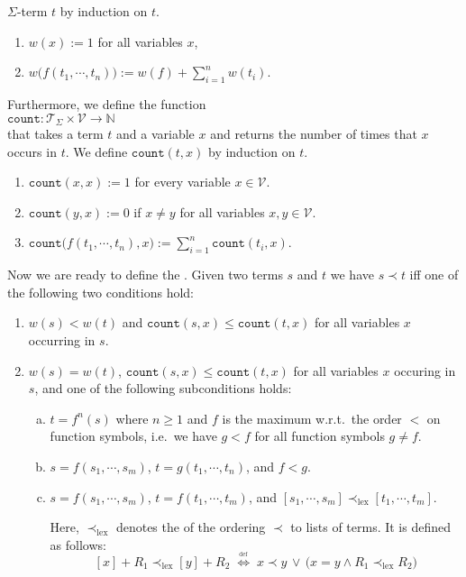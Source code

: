 $\Sigma$-term $t$ by induction on $t$.
\begin{enumerate}
\item $w(x) := 1$ for all variables $x$,
\item $w\bigl(f(t_1,\cdots,t_n)\bigr) := w(f) + \sum\limits_{i=1}^n w(t_i)$.
\end{enumerate}
Furthermore, we define the function
\\[0.2cm]
\hspace*{1.3cm}
$\texttt{count}: \mathcal{T}_\Sigma \times \mathcal{V} \rightarrow \mathbb{N}$
\\[0.2cm]
that takes a term $t$ and a variable $x$ and returns the number of times that $x$ occurs in $t$.
We define $\texttt{count}(t,x)$ by induction on $t$.
\begin{enumerate}
\item $\texttt{count}(x, x) := 1$ for every variable $x \in \mathcal{V}$.
\item $\texttt{count}(y, x) := 0$ if $x \not= y$ for all variables $x,y \in \mathcal{V}$.
\item $\texttt{count}\bigl(f(t_1,\cdots,t_n), x\bigr) := \sum\limits_{i=1}^n \texttt{count}(t_i, x)$.
\end{enumerate}
Now we are ready to define the .  Given two terms $s$ and $t$  
we have $s \prec t$ iff one of the following two conditions hold:
\begin{enumerate}
\item $w(s) < w(t)$ and $\texttt{count}(s, x) \leq \texttt{count}(t, x)$
       for all variables $x$ occurring in  $s$.
\item $w(s) = w(t)$, $\texttt{count}(s, x) \leq \texttt{count}(t, x)$ for all variables $x$ occuring in $s$, and
      one of the following subconditions holds:
      \begin{enumerate}[(a)]
      \item $t = f^n(s)$ where $n \geq 1$ and $f$ is the maximum w.r.t.~the order $<$ on function symbols,
             i.e.~we have $g < f$ for all function symbols $g \not= f$.
      \item $s = f(s_1,\cdots,s_m)$, $t=g(t_1,\cdots,t_n)$, and $f<g$.
      \item $s = f(s_1,\cdots,s_m)$, $t=f(t_1,\cdots,t_m)$, and $[s_1,\cdots,s_m] \prec_{\textrm{lex}} [t_1,\cdots,t_m]$.
     
            Here, $\prec_{\textrm{lex}}$ denotes the  of the ordering $\prec$ to
            lists of terms.  It is defined as follows:
            $$ [x] + R_1 \prec_{\textrm{lex}} [y] + R_2 \;\stackrel{_\textrm{def}}{\Longleftrightarrow}\;
                 x \prec y \,\vee\, \bigl(x = y \wedge R_1 \prec_{\textrm{lex}} R_2\bigr)
            $$
     \end{enumerate}
\end{enumerate}

